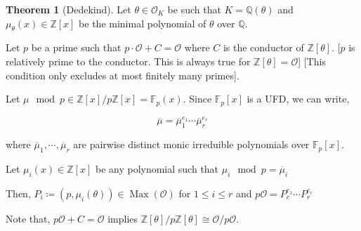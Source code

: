 \documentclass[openany]{amsbook}
\numberwithin{section}{chapter}
\theoremstyle{definition}
\newtheorem{theorem}{Theorem}[chapter]
\begin{document}
\begin{theorem}
    [Dedekind] Let \(\theta \in \mathcal{O}_K\) be such that \(K = \mathbb{Q} (\theta)\) and \(\mu_\theta(x) \in \mathbb{Z} [x]\) be the minimal polynomial of \(\theta\) over \(\mathbb{Q}\).

    Let \(p\) be a prime such that \(p \cdot \mathcal{O} + C = \mathcal{O}\) where \(C\) is the conductor of \(\mathbb{Z}[\theta]\). [\(p\) is relatively prime to the conductor. This is always true for \(\mathbb{Z}[\theta] = \mathcal{O}\)] [This condition only excludes at most finitely many primes].

    Let \(\mu \mod p \in \mathbb{Z} [x] / p \mathbb{Z}[x] = \mathbb{F}_p(x)\). Since \(\mathbb{F}_p[x]\) is a UFD, we can write,
    
    \[
        \overline{\mu} = \overline{\mu}_1^{e_1} \cdots \overline{\mu}_r^{e_r}
    \]

    where \(\overline{\mu}_1, \cdots, \overline{\mu }_r\) are pairwise distinct monic irreduible polynomials over \(\mathbb{F}_p[x]\). 

    Let \(\mu_i(x) \in \mathbb{Z} [x]\) be any polynomial such that \(\mu_i \mod p = \overline{\mu}_i\)

    Then, \(P_i \coloneqq (p, \mu_i(\theta)) \in \operatorname{Max} (\mathcal{O})\) for \(1 \leq i \leq r\) and \(p\mathcal{O} =P_e^{e_1}\cdots P_r^{e_r}\)  
\end{theorem}

Note that, \(p\mathcal{O} + C = \mathcal{O}\) implies \(\mathbb{Z} [\theta] / p \mathbb{Z} [\theta] \cong \mathcal{O} / p \mathcal{O}\).
\end{document}
